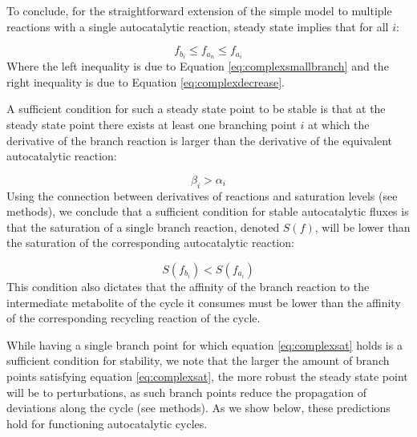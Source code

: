     To conclude, for the straightforward extension of the simple model to multiple reactions with a single autocatalytic reaction, steady state implies that for all $i$:

    \begin{equation}
        f_{b_i} \leq f_{a_n} \leq f_{a_i}
      \label{eq:complexstst}
    \end{equation}
    Where the left inequality is due to Equation \ref{eq:complexsmallbranch} and the right inequality is due to Equation \ref{eq:complexdecrease}.

    A sufficient condition for such a steady state point to be stable is that at the steady state point there exists at least one branching point $i$ at which the derivative of the branch reaction is larger than the derivative of the equivalent autocatalytic reaction:

    \begin{equation}
      \beta_i > \alpha_i
      \label{eq:complexstab}
    \end{equation}
    Using the connection between derivatives of reactions and saturation levels (see methods), we conclude that a sufficient condition for stable autocatalytic fluxes is that the saturation of a single branch reaction, denoted $S(f)$, will be lower than the saturation of the corresponding autocatalytic reaction:

    \begin{equation}
        S(f_{b_i}) < S(f_{a_i})
      \label{eq:complexsat}
    \end{equation}
    This condition also dictates that the affinity of the branch reaction to the intermediate metabolite of the cycle it consumes must be lower than the affinity of the corresponding recycling reaction of the cycle.

    While having a single branch point for which equation \ref{eq:complexsat} holds is a sufficient condition for stability, we note that the larger the amount of branch points satisfying equation \ref{eq:complexsat}, the more robust the steady state point will be to perturbations, as such branch points reduce the propagation of deviations along the cycle (see methods).
    As we show below, these predictions hold for functioning autocatalytic cycles.
